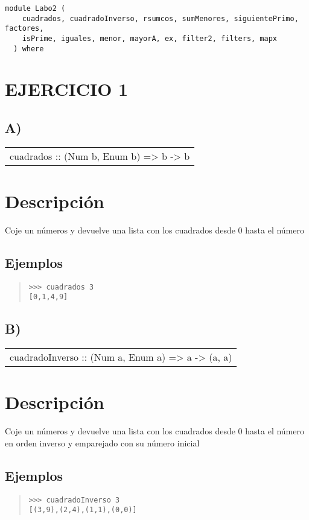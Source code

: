 \label{module:Labo2}
\haddockbeginheader
{\haddockverb\begin{verbatim}
module Labo2 (
    cuadrados, cuadradoInverso, rsumcos, sumMenores, siguientePrimo, factores,
    isPrime, iguales, menor, mayorA, ex, filter2, filters, mapx
  ) where\end{verbatim}}
\haddockendheader

\section{EJERCICIO 1}
\subsection{A)}
\begin{haddockdesc}
\item[\begin{tabular}{@{}l}
cuadrados :: (Num b, Enum b) => b -> {\char 91}b{\char 93}
\end{tabular}]
{\haddockbegindoc
\section*{Descripción}
Coje un números y devuelve una lista con los cuadrados desde 0 hasta el número\par
\subsection*{Ejemplos}
\begin{quote}
{\haddockverb\begin{verbatim}
>>> cuadrados 3
[0,1,4,9]

\end{verbatim}}
\end{quote}}
\end{haddockdesc}
\subsection{B)}
\begin{haddockdesc}
\item[\begin{tabular}{@{}l}
cuadradoInverso :: (Num a, Enum a) => a -> {\char 91}(a, a){\char 93}
\end{tabular}]
{\haddockbegindoc
\section*{Descripción}
Coje un números y devuelve una lista con los cuadrados desde 0 hasta el número en orden inverso y emparejado con su número inicial\par
\subsection*{Ejemplos}
\begin{quote}
{\haddockverb\begin{verbatim}
>>> cuadradoInverso 3
[(3,9),(2,4),(1,1),(0,0)]

\end{verbatim}}
\end{quote}}
\end{haddockdesc}
